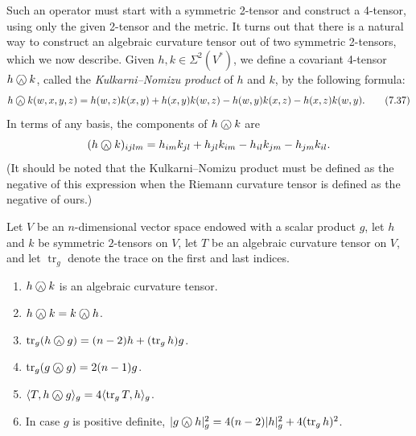 Such an operator must start with a symmetric 2-tensor and construct a 4-tensor, using only the given 2-tensor and the metric. It turns out that there is a natural way to construct an algebraic curvature tensor out of two symmetric 2-tensors, which we now describe. Given $h, k \in \Sigma^2(V^*)$, we define a covariant 4-tensor $h \owedge k$, called the \emph{Kulkarni--Nomizu product} of $h$ and $k$, by the following formula:
\begin{equation}
h \owedge k(w,x,y,z) = h(w,z)k(x,y) + h(x,y)k(w,z) - h(w,y)k(x,z) - h(x,z)k(w,y).
\tag{7.37}
\end{equation}
In terms of any basis, the components of $h \owedge k$ are
\[
(h \owedge k)_{ijlm} = h_{im}k_{jl} + h_{jl}k_{im} - h_{il}k_{jm} - h_{jm}k_{il}.
\]
(It should be noted that the Kulkarni--Nomizu product must be defined as the negative of this expression when the Riemann curvature tensor is defined as the negative of ours.)

\begin{lemma}
\label{lem:kulkarni-nomizu-properties}
Let $V$ be an $n$-dimensional vector space endowed with a scalar product $g$, let $h$ and $k$ be symmetric $2$-tensors on $V$, let $T$ be an algebraic curvature tensor on $V$, and let $\operatorname{tr}_g$ denote the trace on the first and last indices.
\begin{enumerate}
\item[(a)] $h \owedge k$ is an algebraic curvature tensor.
\item[(b)] $h \owedge k = k \owedge h$.
\item[(c)] $\operatorname{tr}_g(h \owedge g) = (n-2)h + (\operatorname{tr}_g h)g$.
\item[(d)] $\operatorname{tr}_g(g \owedge g) = 2(n-1)g$.
\item[(e)] $\langle T, h \owedge g\rangle_g = 4\langle\operatorname{tr}_g T, h\rangle_g$.
\item[(f)] In case $g$ is positive definite, $|g \owedge h|_g^2 = 4(n-2)|h|_g^2 + 4(\operatorname{tr}_g h)^2$.
\end{enumerate}
\end{lemma}

